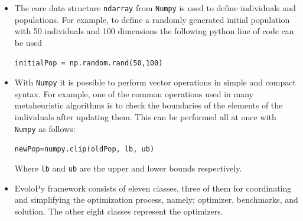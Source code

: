 \documentclass[landscape,a0paper,fontscale=0.285]{baposter} %
\newcommand{\compresslist}{ %
\setlength{\itemsep}{1pt}
\setlength{\parskip}{0pt}
\setlength{\parsep}{0pt}
}
\begin{document}
\begin{poster}
{\begin{multicols}{2}
\begin{itemize}
\item  The core data structure \texttt{ndarray} from \texttt{Numpy} is used to define individuals and populations. For example, to define a randomly generated initial population with 50 individuals and 100 dimensions the following python line of code can be used

\texttt{initialPop = np.random.rand(50,100)}


\item With \texttt{Numpy} it is possible to perform vector operations in simple and compact syntax. For example, one of the common operations used in many metaheuristic algorithms is to check the boundaries of the elements of the individuals after updating them. This can be performed all at once with \texttt{Numpy} as follows:

\texttt{newPop=numpy.clip(oldPop, lb, ub)}

Where \texttt{lb} and \texttt{ub} are the upper and lower bounds respectively.






\item  EvoloPy framework consists of eleven classes, three of them for coordinating and simplifying the optimization process, namely; optimizer, benchmarks, and solution. The other eight classes represent the optimizers.  

\end{itemize}




\end{multicols}}
\end{poster}
\end{document}
